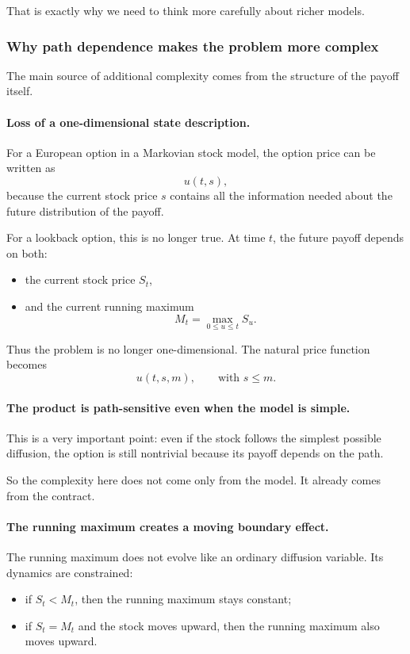 \documentclass[11pt]{article}
\theoremstyle{plain}
\theoremstyle{definition}
\theoremstyle{remark}
\begin{document}
That is exactly why we need to think more carefully about richer models.

\subsubsection{Why path dependence makes the problem more complex}

The main source of additional complexity comes from the structure of the
payoff itself.

\paragraph{Loss of a one-dimensional state description.}
For a European option in a Markovian stock model, the option price can
be written as
\[
u(t,s),
\]
because the current stock price \(s\) contains all the information
needed about the future distribution of the payoff.

For a lookback option, this is no longer true.
At time \(t\), the future payoff depends on both:
\begin{itemize}[leftmargin=1.4em]
    \item the current stock price \(S_t\),
    \item and the current running maximum
    \[
    M_t=\max_{0\le u\le t}S_u.
    \]
\end{itemize}

Thus the problem is no longer one-dimensional.
The natural price function becomes
\[
u(t,s,m),
\qquad \text{with } s\le m.
\]

\paragraph{The product is path-sensitive even when the model is simple.}
This is a very important point:
even if the stock follows the simplest possible diffusion, the option is
still nontrivial because its payoff depends on the path.

So the complexity here does not come only from the model.
It already comes from the contract.

\paragraph{The running maximum creates a moving boundary effect.}
The running maximum does not evolve like an ordinary diffusion variable.
Its dynamics are constrained:
\begin{itemize}[leftmargin=1.4em]
    \item if \(S_t<M_t\), then the running maximum stays constant;
    \item if \(S_t=M_t\) and the stock moves upward, then the running
    maximum also moves upward.
\end{itemize}
\end{document}

